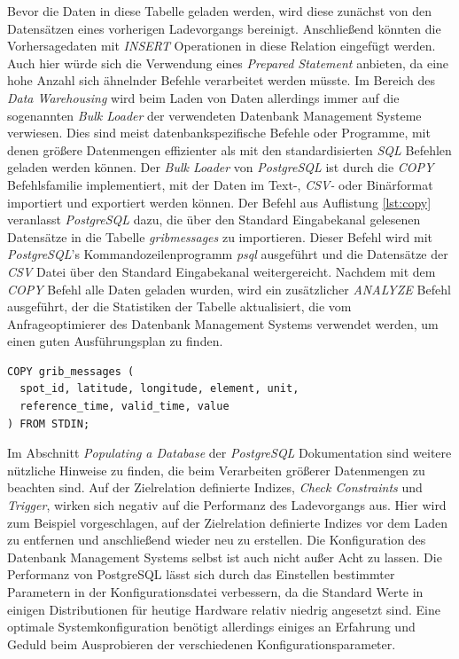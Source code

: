 Bevor die Daten in diese Tabelle geladen werden, wird diese zunächst
von den Datensätzen eines vorherigen Ladevorgangs
bereinigt. Anschließend könnten die Vorhersagedaten mit
\textit{INSERT} Operationen in diese Relation eingefügt werden. Auch
hier würde sich die Verwendung eines \textit{Prepared Statement}
anbieten, da eine hohe Anzahl sich ähnelnder Befehle verarbeitet
werden müsste. Im Bereich des \textit{Data Warehousing} wird beim
Laden von Daten allerdings immer auf die sogenannten \textit{Bulk
  Loader} der verwendeten Datenbank Management Systeme verwiesen. Dies
sind meist datenbankspezifische Befehle oder Programme, mit denen
größere Datenmengen effizienter als mit den standardisierten
\textit{SQL} Befehlen geladen werden können. Der \textit{Bulk Loader}
von \textit{PostgreSQL} ist durch die \textit{COPY} Befehlsfamilie
implementiert, mit der Daten im Text-, \textit{CSV-} oder Binärformat
importiert und exportiert werden können. Der Befehl aus Auflistung
\ref{lst:copy} veranlasst \textit{PostgreSQL} dazu, die über den
Standard Eingabekanal gelesenen Datensätze in die Tabelle
\textit{grib\textunderscore messages} zu importieren. Dieser Befehl
wird mit \textit{PostgreSQL}'s Kommandozeilenprogramm \textit{psql}
ausgeführt und die Datensätze der \textit{CSV} Datei über den Standard
Eingabekanal weitergereicht. Nachdem mit dem \textit{COPY} Befehl alle
Daten geladen wurden, wird ein zusätzlicher \textit{ANALYZE} Befehl
ausgeführt, der die Statistiken der Tabelle aktualisiert, die vom
Anfrageoptimierer des Datenbank Management Systems verwendet werden,
um einen guten Ausführungsplan zu finden.

\begin{lstlisting}[captionpos=b, caption=Befehl zum Import von Datensätzen in \textit{PostgreSQL}, label=lst:copy]
COPY grib_messages (
  spot_id, latitude, longitude, element, unit, 
  reference_time, valid_time, value
) FROM STDIN;
\end{lstlisting}

Im Abschnitt \textit{Populating a Database} \cite{postgresql:populate}
der \textit{PostgreSQL} Dokumentation sind weitere nützliche Hinweise
zu finden, die beim Verarbeiten größerer Datenmengen zu beachten
sind. Auf der Zielrelation definierte Indizes, \textit{Check
  Constraints} und \textit{Trigger}, wirken sich negativ auf die
Performanz des Ladevorgangs aus. Hier wird zum Beispiel vorgeschlagen,
auf der Zielrelation definierte Indizes vor dem Laden zu entfernen und
anschließend wieder neu zu erstellen. Die Konfiguration des Datenbank
Management Systems selbst ist auch nicht außer Acht zu lassen. Die
Performanz von PostgreSQL lässt sich durch das Einstellen bestimmter
Parametern in der Konfigurationsdatei verbessern, da die Standard
Werte in einigen Distributionen für heutige Hardware relativ niedrig
angesetzt sind. Eine optimale Systemkonfiguration benötigt allerdings
einiges an Erfahrung und Geduld beim Ausprobieren der verschiedenen
Konfigurationsparameter.

